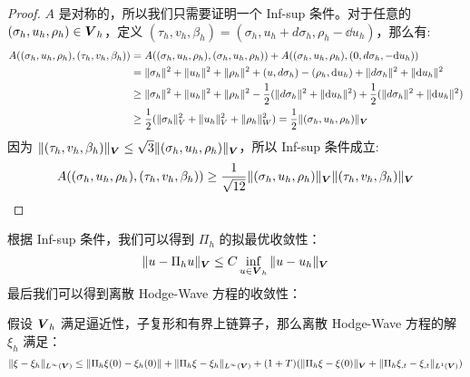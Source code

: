 \documentclass[lang=cn,a4paper,newtx]{elegantpaper}
\begin{document}
\begin{proof}
$A$ 是对称的，所以我们只需要证明一个 Inf-sup 条件。对于任意的 $(\sigma_h, u_h,
\rho_h) \in \boldsymbol{V}_h$，定义 $(\tau_h, v_h, \beta_h) = (\sigma_h, u_h + d\sigma_h,
\rho_h - \dd u_h)$，那么有:
$$
\begin{aligned}
A((\sigma_h, u_h, \rho_h), (\tau_h, v_h, \beta_h)) & =
A((\sigma_h, u_h, \rho_h), (\sigma_h, u_h, \rho_h)) + 
A((\sigma_h, u_h, \rho_h), (0, d\sigma_h, -\mathrm{d} u_h))\\
& = \|\sigma_h\|^2 + \|u_h\|^2 + \|\rho_h\|^2 + (u, d\sigma_h) - (\rho_h, \mathrm{d}
u_h) + \|d\sigma_h\|^2 + \|\mathrm{d} u_h\|^2\\
&\geq \|\sigma_h\|^2 + \|u_h\|^2 + \|\rho_h\|^2 - \frac{1}{2}(\|d\sigma_h\|^2 +
\|\mathrm{d} u_h\|^2) + \frac{1}{2}(\|d\sigma_h\|^2 + \|\mathrm{d} u_h\|^2) \\
&\geq
\frac{1}{2}(\|\sigma_h\|^2_V + \|u_h\|^2_V + \|\rho_h\|^2_W) = \frac{1}{2}\|(\sigma_h,
u_h, \rho_h)\|_{\boldsymbol{V}}
\end{aligned}
$$
因为 $\|(\tau_h, v_h, \beta_h)\|_{\boldsymbol{V}} \leq \sqrt{3}\|(\sigma_h, u_h,
\rho_h)\|_{\boldsymbol{V}}$，所以 Inf-sup 条件成立:
$$
A((\sigma_h, u_h, \rho_h), (\tau_h, v_h, \beta_h)) \geq
\frac{1}{\sqrt{12}}\|(\sigma_h, u_h, \rho_h)\|_{\boldsymbol{V}}\|(\tau_h, v_h,
\beta_h)\|_{\boldsymbol{V}}
$$
\end{proof}
根据 Inf-sup 条件，我们可以得到 $\Pi_h$ 的拟最优收敛性：
$$
\|u-\Pi_h u\|_{\boldsymbol{V}} \leq C \inf_{u \in \boldsymbol{V}_h} \|u - u_h\|_{\boldsymbol{V}}
$$
最后我们可以得到离散 Hodge-Wave 方程的收敛性：
\begin{theorem}
假设 $\boldsymbol{V}_h$ 满足逼近性，子复形和有界上链算子，那么离散 Hodge-Wave
方程的解 $\xi_h$ 满足：
$$
\|\xi - \xi_h\|_{L^{\infty}(\boldsymbol{V})} \leq \|\Pi_h \xi(0) - \xi_h(0)\| + 
\|\Pi_h \xi - \xi_h\|_{L^{\infty}(\boldsymbol{V})} + (1+T)(\|\Pi_h\xi - \xi(0)\|_{\boldsymbol{V}}
+ \|\Pi_h\xi_{,t} - \xi_{, t}\|_{L^1(\boldsymbol{V})})
$$
\end{theorem}
\end{document}
